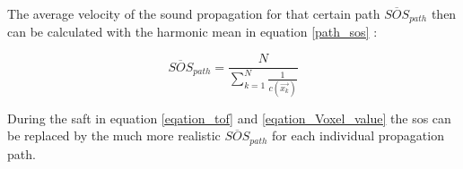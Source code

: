 The average velocity of the sound propagation for that certain path $\overline{SOS}_{path}$ then can be calculated with the harmonic mean in equation \ref{path_sos} \cite{Kretzek2014GPUAberration}:

\begin{equation}
 \overline{SOS}_{path} = \frac{N}{\sum_{k=1}^{N}  \frac{1}{c(\overrightarrow {x_k})} } 
\label{path_sos}
\end{equation}

During the \ac{saft} in equation \ref{eqation_tof} and \ref{eqation_Voxel_value} the \ac{sos} can be replaced by the much more realistic $\overline{SOS}_{path}$ for each individual propagation path.










